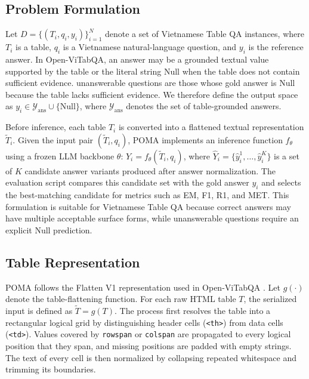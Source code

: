 \documentclass[]{interact}
\begin{document}
\subsection{Problem Formulation}

Let $D=\{(T_i,q_i,y_i)\}_{i=1}^{N}$ denote a set of Vietnamese Table QA instances, where $T_i$ is a table, $q_i$ is a Vietnamese natural-language question, and $y_i$ is the reference answer. In Open-ViTabQA, an answer may be a grounded textual value supported by the table or the literal string Null when the table does not contain sufficient evidence. unanswerable questions are those whose gold answer is Null because the table lacks sufficient evidence. We therefore define the output space as $y_i \in \mathcal{Y}_{\mathrm{ans}} \cup \{\text{Null}\}$, where $\mathcal{Y}_{\mathrm{ans}}$ denotes the set of table-grounded answers.

Before inference, each table $T_i$ is converted into a flattened textual representation $\tilde{T}_i$. Given the input pair $(\tilde{T}_i,q_i)$, POMA implements an inference function $f_{\theta}$ using a frozen LLM backbone $\theta$: $\hat{Y}_i=f_{\theta}(\tilde{T}_i,q_i)$, where $\hat{Y}_i=\{\hat{y}_{i}^{1},\ldots,\hat{y}_{i}^{K}\}$ is a set of $K$ candidate answer variants produced after answer normalization. The evaluation script compares this candidate set with the gold answer $y_i$ and selects the best-matching candidate for metrics such as EM, F1, R1, and MET. This formulation is suitable for Vietnamese Table QA because correct answers may have multiple acceptable surface forms, while unanswerable questions require an explicit Null prediction.

\subsection{Table Representation}

POMA follows the Flatten V1 representation used in Open-ViTabQA \citep{openvitabqa2025}. Let $g(\cdot)$ denote the table-flattening function. For each raw HTML table $T$, the serialized input is defined as $\tilde{T}=g(T)$. The process first resolves the table into a rectangular logical grid by distinguishing header cells (\texttt{<th>}) from data cells (\texttt{<td>}). Values covered by \texttt{rowspan} or \texttt{colspan} are propagated to every logical position that they span, and missing positions are padded with empty strings. The text of every cell is then normalized by collapsing repeated whitespace and trimming its boundaries.
\end{document}
